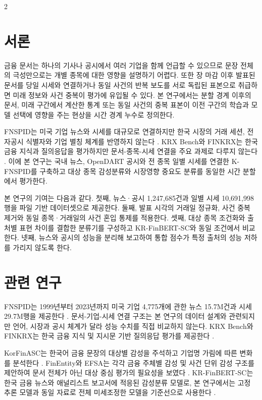 \documentclass[10pt]{article}
\newcommand{\dataset}{K-FNSPID}
\begin{document}
\newpage
\begin{multicols}{2}

\section{서론}

금융 문서는 하나의 기사나 공시에서 여러 기업을 함께 언급할 수 있으므로 문장 전체의 극성만으로는 개별 종목에 대한 영향을 설명하기 어렵다. 또한 장 마감 이후 발표된 문서를 당일 시세와 연결하거나 동일 사건의 반복 보도를 서로 독립된 표본으로 취급하면 미래 정보와 사건 중복이 평가에 유입될 수 있다. 본 연구에서는 분할 경계 이후의 문서, 미래 구간에서 계산한 통계 또는 동일 사건의 중복 표본이 이전 구간의 학습과 모델 선택에 영향을 주는 현상을 시간 경계 누수로 정의한다.

FNSPID는 미국 기업 뉴스와 시세를 대규모로 연결하지만 한국 시장의 거래 세션, 전자공시 식별자와 기업 별칭 체계를 반영하지 않는다 \cite{dong-etal-2024-fnspid}. KRX Bench와 FINKRX는 한국 금융 지식과 질의응답을 평가하지만 문서-종목-시세 연결을 주요 과제로 다루지 않는다 \cite{son-etal-2024-krx,son-etal-2025-finkrx}. 이에 본 연구는 국내 뉴스, OpenDART 공시와 전 종목 일별 시세를 연결한 \dataset{}를 구축하고 대상 종목 감성분류와 시장영향 중요도 분류를 동일한 시간 분할에서 평가한다.

본 연구의 기여는 다음과 같다. 첫째, 뉴스·공시 1,247,685건과 일별 시세 10,691,998행을 파일 기반 데이터셋으로 제공한다. 둘째, 발표 시각의 거래일 정규화, 사건 중복 제거와 동일 종목·거래일의 사건 혼입 통제를 적용한다. 셋째, 대상 종목 조건화와 출처별 표현 차이를 결합한 분류기를 구성하고 KR-FinBERT-SC와 동일 조건에서 비교한다. 넷째, 뉴스와 공시의 성능을 분리해 보고하여 통합 점수가 특정 출처의 성능 저하를 가리지 않도록 한다.

\section{관련 연구}

FNSPID는 1999년부터 2023년까지 미국 기업 4,775개에 관한 뉴스 15.7M건과 시세 29.7M행을 제공한다 \cite{dong-etal-2024-fnspid}. 문서-기업-시세 연결 구조는 본 연구의 데이터 설계와 관련되지만 언어, 시장과 공시 체계가 달라 성능 수치를 직접 비교하지 않는다. KRX Bench와 FINKRX는 한국 금융 지식 및 지시문 기반 질의응답 평가를 제공한다 \cite{son-etal-2024-krx,son-etal-2025-finkrx}.

KorFinASC는 한국어 금융 문장의 대상별 감성을 주석하고 기업명 가림에 따른 변화를 분석한다 \cite{son-etal-2023-korfinasc}. FinEntity와 EFSA는 각각 금융 주체별 감성 및 사건 단위 감성 구조를 제안하여 문서 전체가 아닌 대상 중심 평가의 필요성을 보였다 \cite{tang-etal-2023-finentity,chen-etal-2024-efsa}. KR-FinBERT-SC는 한국 금융 뉴스와 애널리스트 보고서에 적응된 감성분류 모델로, 본 연구에서는 고정 추론 모델과 동일 자료로 전체 미세조정한 모델을 기준선으로 사용한다 \cite{kim-shin-2022-krfinbert}.


\end{multicols}
\end{document}
